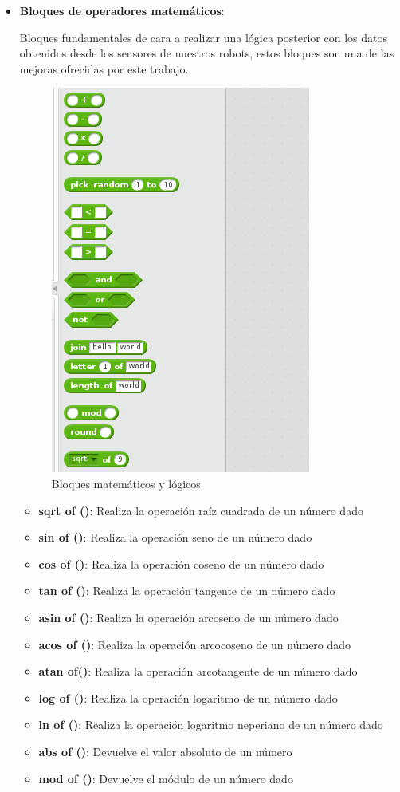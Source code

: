 \begin{itemize}
\item \textbf{Bloques de operadores matemáticos}:

Bloques fundamentales de cara a realizar una lógica posterior con los datos obtenidos desde los sensores de nuestros robots, estos bloques son una de las mejoras ofrecidas por este trabajo.
\begin{figure}[H]
    	\centering
    	\includegraphics[scale=0.60]{img/bloques-mat.png}
     	\caption{Bloques matemáticos y lógicos}
  	\label{fig:mat}
\end{figure}

	\begin{itemize}

    \item \textbf{sqrt of ()}: Realiza la operación raíz cuadrada de un número dado
    \item \textbf{sin of ()}: Realiza la operación seno de un número dado
    \item \textbf{cos of ()}: Realiza la operación coseno de un número dado
    \item \textbf{tan of ()}: Realiza la operación tangente de un número dado
    \item \textbf{asin of ()}: Realiza la operación arcoseno de un número dado
    \item \textbf{acos of ()}: Realiza la operación arcocoseno de un número dado
    \item \textbf{atan of()}: Realiza la operación arcotangente de un número dado
    \item \textbf{log of ()}: Realiza la operación logaritmo de un número dado
    \item \textbf{ln of ()}: Realiza la operación logaritmo neperiano de un número dado
    \item \textbf{abs of ()}: Devuelve el valor absoluto de un número
    \item \textbf{mod of ()}: Devuelve el módulo de un número dado
    \end{itemize}


\end{itemize}
